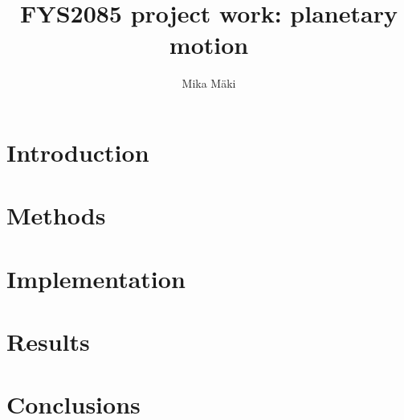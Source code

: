 \documentclass[a4paper]{article}
\title{FYS2085 project work: planetary motion}
\author{Mika Mäki}
\begin{document}
\section*{Introduction}


\section{Methods}


\section{Implementation}


\section{Results}


\section{Conclusions}
\end{document}
